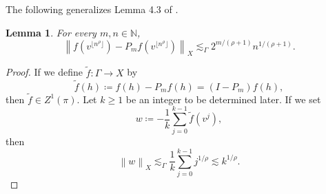 \documentclass[11pt,reqno]{amsart}
\newtheorem{lemma}[theorem]{Lemma}
\newcommand{\1}{\mathbf 1}
\begin{document}
The following generalizes Lemma 4.3 of \cite{austin2013sharp}.
\begin{lemma}\label{L3}
For every $m,n\in \mathbb{N}$,
\[
\left\| f\left(v^{\lfloor n^\rho\rfloor}\right)-P_m f\left(v^{\lfloor n^\rho\rfloor}\right)\right\|_X\lesssim_\Gamma 2^{m/\left(\rho+1\right)}n^{1/\left(\rho+1\right)}.
\]
\end{lemma}
\begin{proof}
If we define $\tilde{f}:\Gamma\to X$ by
\[
\tilde{f}\left(h\right)\coloneqq f\left(h\right)-P_mf\left(h\right)=\left(I-P_m\right)f\left(h\right),
\]
then $\tilde{f}\in Z^1\left(\pi\right)$. Let $k\ge 1$ be an integer to be determined later. If we set
\[
w\coloneqq -\frac 1k \sum_{j=0}^{k-1}\tilde{f}\left(v^j\right),
\]
then
\begin{equation}\label{eq:w-size}
\left\|w\right\|_X\lesssim_\Gamma \frac 1k\sum_{j=0}^{k-1}j^{1/\rho}\lesssim k^{1/\rho}.
\end{equation}


\end{proof}
\end{document}
